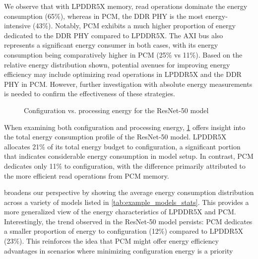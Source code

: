 We observe that with LPDDR5X memory, read operations dominate the energy consumption (65\%), whereas in PCM, the DDR PHY is the most energy-intensive (43\%).
Notably, PCM exhibits a much higher proportion of energy dedicated to the DDR PHY compared to LPDDR5X.
The AXI bus also represents a significant energy consumer in both cases, with its energy consumption being comparatively higher in PCM (25\% vs 11\%).
Based on the relative energy distribution shown, potential avenues for improving energy efficiency may include optimizing read operations in LPDDR5X and the DDR PHY in PCM.
However, further investigation with absolute energy measurements is needed to confirm the effectiveness of these strategies.

\begin{figure}[hbtp]
    \centering
    \hfill
    \caption{Configuration vs. processing energy for the ResNet-50 model}
    \label{fig:resnet50_conf_proc}
\end{figure}

When examining both configuration and processing energy, \cref{fig:resnet50_conf_proc} offers insight into the total energy consumption profile of the ResNet-50 model.
LPDDR5X allocates 21\% of its total energy budget to configuration, a significant portion that indicates considerable energy consumption in model setup.
In contrast, PCM dedicates only 11\% to configuration, with the difference primarily attributed to the more efficient read operations from PCM memory.

 broadens our perspective by showing the average energy consumption distribution across a variety of models listed in \cref{tab:example_models_stats}.
This provides a more generalized view of the energy characteristics of LPDDR5X and PCM.
Interestingly, the trend observed in the ResNet-50 model persists: PCM dedicates a smaller proportion of energy to configuration (12\%) compared to LPDDR5X (23\%).
This reinforces the idea that PCM might offer energy efficiency advantages in scenarios where minimizing configuration energy is a priority

